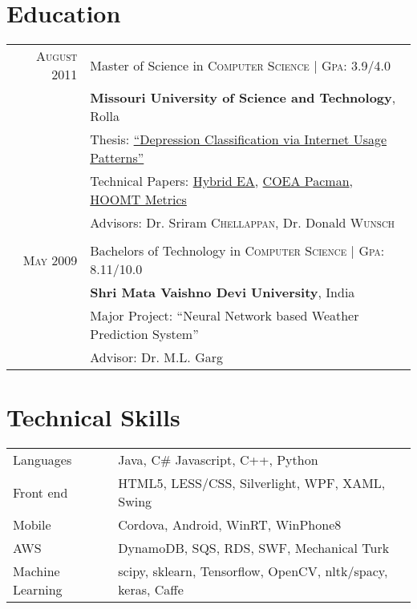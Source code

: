 \documentclass[a4paper,11pt]{article}
\begin{document}
\section{Education}
\begin{tabularx}{0.95\textwidth}{rX}	
  \textsc{August} 2011 & Master of Science in \textsc{Computer Science} | \normalsize \textsc{Gpa}: 3.9/4.0 \\
& \normalsize \textbf{Missouri University of Science and Technology}, Rolla \\
& Thesis: \href{https://github.com/raghakot/papers/blob/master/thesis.pdf}{``Depression Classification via Internet Usage Patterns''} \\
& Technical Papers: \href{https://github.com/raghakot/papers/blob/master/SPSS.pdf}{Hybrid EA}, \href{https://github.com/raghakot/papers/blob/master/coea_pacman.pdf}{COEA Pacman}, \href{https://github.com/raghakot/papers/blob/master/hoomt_metrics.pdf}{HOOMT Metrics} \\
& \small Advisors: Dr. Sriram \textsc{Chellappan}, Dr. Donald \textsc{Wunsch}\\
& \\
  \textsc{May} 2009 & Bachelors of Technology in \textsc{Computer Science} | \normalsize \textsc{Gpa}: 8.11/10.0 \\
& \normalsize \textbf{Shri Mata Vaishno Devi University}, India \\
& Major Project: ``Neural Network based Weather Prediction System'' \\
& \small Advisor: Dr. M.L. Garg \\
\end{tabularx}

\section{Technical Skills}
\begin{longtable}{lp{11cm}}
 Languages & Java, C\# Javascript, C++, Python \\
 Front end & HTML5, LESS/CSS, Silverlight, WPF, XAML, Swing \\
 Mobile & Cordova, Android, WinRT, WinPhone8 \\
 AWS & DynamoDB, SQS, RDS, SWF, Mechanical Turk \\
 Machine Learning & scipy, sklearn, Tensorflow, OpenCV, nltk/spacy, keras, Caffe \\
\end{longtable}
\end{document}
